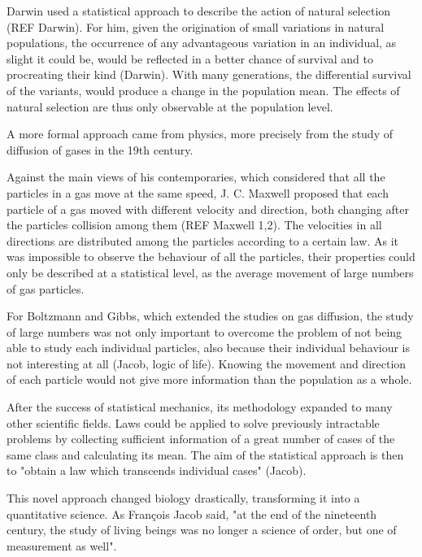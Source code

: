 Darwin used a statistical approach to describe the action of natural selection (REF Darwin). For him, given the origination of small variations in natural populations, the occurrence of any advantageous variation in an individual, as slight it could be, would be reflected in a better chance of survival and to procreating their kind (Darwin). With many generations, the differential survival of the variants, would produce a change in the population mean. 
The effects of natural selection are thus only observable at the population level.

A more formal approach came from physics, more precisely from the study of diffusion of gases in the 19th century.

Against the main views of his contemporaries, which considered that all the particles in a gas move at the same speed, J. C. Maxwell proposed that each particle of a gas moved with different velocity and direction, both changing after the particles collision among them (REF Maxwell 1,2).
The velocities in all directions are distributed among the particles according to a certain law. As it was impossible to observe the behaviour of all the particles, their properties could only be described at a statistical level, as the average movement of large numbers of gas particles.

For Boltzmann and Gibbs, which extended the studies on gas diffusion, the study of large numbers was not only important to overcome the problem of not being able to study each individual particles, also because their individual behaviour is not interesting at all (Jacob, logic of life). Knowing the movement and direction of each particle would not give more information than the population as a whole.

After the success of statistical mechanics, its methodology expanded to many other scientific fields.
Laws could be applied to solve previously intractable problems by collecting sufficient information of a great number of cases of the same class and calculating its mean. The aim of the statistical approach is then to "obtain a law which transcends individual cases" (Jacob).

This novel approach changed biology drastically, transforming it into a quantitative science. As Fran\c{c}ois Jacob said, "at the end of the nineteenth century, the study of living beings was no longer a science of order, but one of measurement as well".




